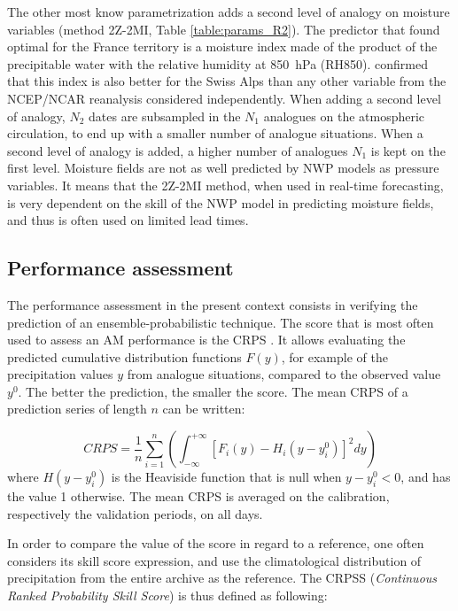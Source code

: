 \documentclass[review]{elsarticle}
\begin{document}
The other most know parametrization adds a second level of analogy on moisture variables (method 2Z-2MI, Table \ref{table:params_R2}). The predictor that \citet{Bontron2004} found optimal for the France territory is a moisture index made of the product of the precipitable water with the relative humidity at 850~hPa (RH850). \cite{Horton2012a} confirmed that this index is also better for the Swiss Alps than any other variable from the NCEP/NCAR reanalysis considered independently. When adding a second level of analogy, $N_{2}$ dates are subsampled in the $N_{1}$ analogues on the atmospheric circulation, to end up with a smaller number of analogue situations. When a second level of analogy is added, a higher number of analogues $N_{1}$ is kept on the first level. Moisture fields are not as well predicted by NWP models as pressure variables. It means that the 2Z-2MI method, when used in real-time forecasting, is very dependent on the skill of the NWP model in predicting moisture fields, and thus is often used on limited lead times.


\subsection{Performance assessment}
\label{sec:score}

The performance assessment in the present context consists in verifying the prediction of an ensemble-probabilistic technique. The score that is most often used to assess an AM performance is the CRPS \citep[Continuous Ranked Probability Score,][]{Brown1974, Matheson1976, Hersbach2000}. It allows evaluating the predicted cumulative distribution functions $F(y)$, for example of the precipitation values $y$ from analogue situations, compared to the observed value $y^{0}$. The better the prediction, the smaller the score. The mean CRPS of a prediction series of length $n$ can be written:

\begin{equation}
\label{eq:CRPS}
CRPS = \frac{1}{n} \sum_{i=1}^{n} \left(  \int_{-\infty}^{+\infty} \left[ F_{i}(y)-H_{i}(y-y_{i}^{0})\right]^{2} dy \right) 
\end{equation}
where $H(y-y_{i}^{0})$ is the Heaviside function that is null when $y-y_{i}^{0}<0$, and has the value 1 otherwise. The mean CRPS is averaged on the calibration, respectively the validation periods, on all days.

In order to compare the value of the score in regard to a reference, one often considers its skill score expression, and use the climatological distribution of precipitation from the entire archive as the reference. The CRPSS (\textit{Continuous Ranked Probability Skill Score}) is thus defined as following:
\end{document}
